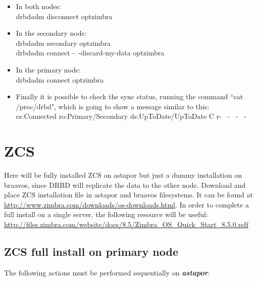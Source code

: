 \documentclass[a4paper, 12pt]{book}
\begin{document}
\begin{itemize}
	\item In both nodes:\\
		drbdadm disconnect optzimbra
	
	\item In the secondary node:\\
		drbdadm secondary optzimbra\\
		drbdadm connect -\ -discard-my-data optzimbra
	
	\item In the primary node:\\
		drbdadm connect optzimbra
	
	\item Finally it is possible to check the sync status, running the command ``cat /proc/drbd", which is going to show a message similar to this:\\
		cs:Connected ro:Primary/Secondary ds:UpToDate/UpToDate C r- \ - \ - \ -

\end{itemize}

\section{ZCS}
\label{sec:zcs}

Here will be fully installed ZCS on astapor but just a dummy installation on braavos, since DRBD will replicate the data to the other node. Download and place ZCS installation file in astapor and braavos filesystems. It can be found at \url{http://www.zimbra.com/downloads/os-downloads.html}. In order to complete a full install on a single server, the following resource will be useful:\\
\url{http://files.zimbra.com/website/docs/8.5/Zimbra_OS_Quick_Start_8.5.0.pdf}


\subsection{ZCS full install on primary node}
\label{sec:fullinstall}

The following actions must be performed sequentially on \textit{\textbf{astapor}}.
\end{document}
